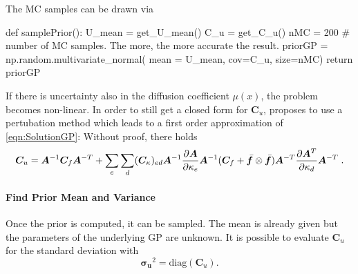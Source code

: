 \documentclass[%
  a4paper,oneside,%
  11pt,%
  smallchapters,
  style=printdev,
  extramargin,
  green,%
  rgb, <cmyk>
  ]{tubsbook}
\begin{document}
The MC samples can be drawn via
\begin{python}
def samplePrior():
	U_mean = get_U_mean()
	C_u = get_C_u()
	nMC = 200 # number of MC samples. The more, the more accurate the result.
	priorGP = np.random.multivariate_normal(
		mean = U_mean, cov=C_u,
		size=nMC)
	return priorGP
\end{python}

If there is uncertainty also in the diffusion coefficient $\mu(x)$, the problem becomes non-linear. In order to still get a closed form for $\bm{C}_u$, \cite[p. 7]{girolami2021} proposes to use a pertubation method which leads to a first order approximation of \eqref{eqn:SolutionGP}: Without proof, there holds 
\begin{equation}
\bm{C}_u = \bm{A}^{-1} \bm{C}_f \bm{A}^{-T} + \sum_e \sum_d (\bm{C}_{\kappa})_{ed} \bm{A}^{-1} \pdv{\bm{A}}{\kappa_e} \bm{A}^{-1} (\bm{C}_f + \bar{\bm{f}} \otimes \bar{\bm{f}}) \bm{A}^{-T}\pdv{\bm{A}^T}{\kappa_d} \bm{A}^{-T} \;.
\end{equation}


\paragraph{Find Prior Mean and Variance}
Once the prior is computed, it can be sampled. The mean is already given but the parameters of the underlying GP are unknown. It is possible to evaluate $\bm{C}_u$ for the standard deviation with
\begin{equation}
\bm{\sigma_u}^2 =  \mathrm{diag}(\bm{C}_u).
\label{eqn:varCu}
\end{equation}
\end{document}
